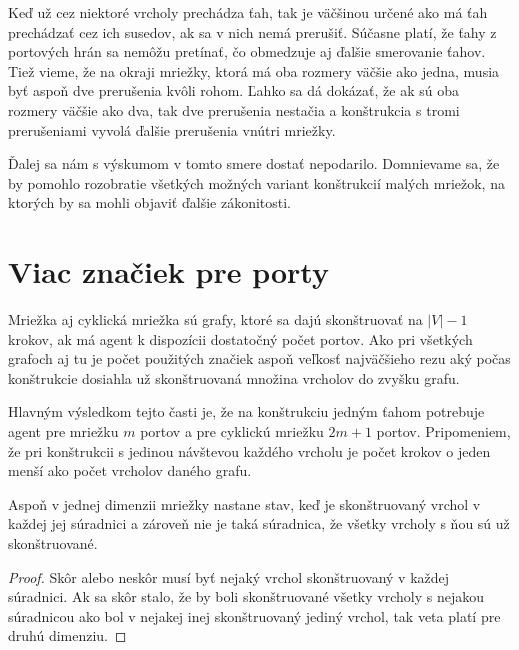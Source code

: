 Keď už cez niektoré vrcholy prechádza ťah, tak je väčšinou určené ako má ťah
prechádzať cez ich susedov, ak sa v nich nemá prerušiť. Súčasne platí, že
ťahy z portových hrán sa nemôžu pretínať, čo obmedzuje aj ďalšie smerovanie
ťahov. Tiež vieme, že na okraji mriežky, ktorá má oba rozmery väčšie ako
jedna, musia byť aspoň dve prerušenia kvôli rohom. Ľahko sa dá dokázať, že
ak sú oba rozmery väčšie ako dva, tak dve prerušenia nestačia a konštrukcia
s tromi prerušeniami vyvolá ďalšie prerušenia vnútri mriežky.

Ďalej sa nám s výskumom v tomto smere dostať nepodarilo. Domnievame sa, že
by pomohlo rozobratie všetkých možných variant konštrukcií malých mriežok, na
ktorých by sa mohli objaviť ďalšie zákonitosti.

\section{Viac značiek pre porty}
Mriežka aj cyklická mriežka sú grafy, ktoré sa dajú skonštruovať na $|V| - 1$
krokov, ak má agent k dispozícii dostatočný počet portov. Ako pri všetkých
grafoch aj tu je počet použitých značiek aspoň veľkosť najväčšieho rezu aký
počas konštrukcie dosiahla už skonštruovaná množina vrcholov do zvyšku
grafu.

Hlavným výsledkom tejto časti je, že na konštrukciu jedným ťahom potrebuje 
agent pre mriežku $m$ portov a pre
cyklickú mriežku $2m + 1$ portov. Pripomeniem, že pri konštrukcii s jedinou
návštevou každého vrcholu je počet krokov o jeden menší ako počet vrcholov
daného grafu.

\begin{lem}
\label{aspoň}
Aspoň v jednej dimenzii mriežky nastane stav, keď je skonštruovaný vrchol v každej
jej súradnici a zároveň nie je taká súradnica, že všetky vrcholy s ňou sú už
skonštruované.
\end{lem}

\begin{proof}
Skôr alebo neskôr musí byť nejaký vrchol skonštruovaný v každej súradnici.
Ak sa skôr stalo, že by boli skonštruované všetky vrcholy s nejakou
súradnicou ako bol v nejakej inej skonštruovaný jediný vrchol, tak veta
platí pre druhú dimenziu.
\end{proof}

